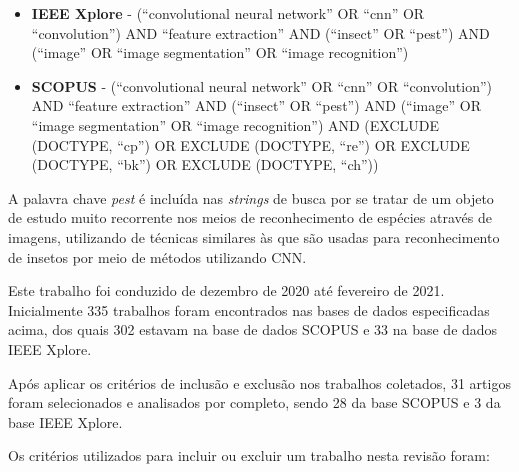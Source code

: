 \documentclass[
	12pt,				%
	oneside,			%
	a4paper,			%
	english,			%
	brazil				%
	]{abntex2ppgsi}
\begin{document}
\begin{itemize}
  \item \textbf{IEEE Xplore} - (``convolutional neural network'' OR ``cnn'' OR ``convolution'') AND ``feature extraction'' AND (``insect'' OR ``pest'') AND (``image'' OR ``image segmentation'' OR ``image recognition'')
  \item \textbf{SCOPUS} - (``convolutional neural network'' OR ``cnn'' OR ``convolution'') AND ``feature extraction'' AND (``insect'' OR ``pest'') AND (``image'' OR ``image segmentation'' OR ``image recognition'') AND (EXCLUDE (DOCTYPE, ``cp'') OR EXCLUDE (DOCTYPE, ``re'') OR EXCLUDE (DOCTYPE, ``bk'') OR EXCLUDE (DOCTYPE, ``ch''))
\end{itemize}

A palavra chave \textit{pest} é incluída nas \textit{strings} de busca por se tratar de um objeto de estudo muito recorrente nos meios de reconhecimento de espécies através de imagens, utilizando de técnicas similares às que são usadas para reconhecimento de insetos por meio de métodos utilizando CNN.

Este trabalho foi conduzido de dezembro de 2020 até fevereiro de 2021. Inicialmente 335 trabalhos foram encontrados nas bases de dados especificadas acima, dos quais 302 estavam na base de dados SCOPUS e 33 na base de dados IEEE Xplore.

Após aplicar os critérios de inclusão e exclusão nos trabalhos coletados, 31 artigos foram selecionados e analisados por completo, sendo 28 da base SCOPUS e 3 da base IEEE Xplore.

Os critérios utilizados para incluir ou excluir um trabalho nesta revisão foram:
\end{document}
